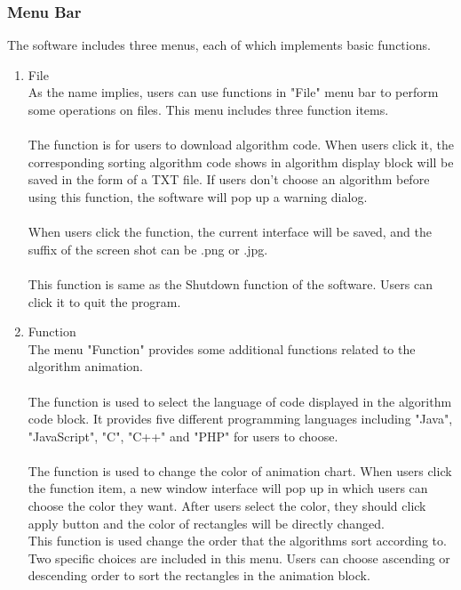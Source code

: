\documentclass[paper=a4, fontsize=11pt,twoside]{scrartcl}		%
\begin{document}
\subsubsection{Menu Bar}
The software includes three menus, each of which implements basic functions.  
\begin{enumerate}
\item File \\
As the name implies, users can use functions in "File" menu bar to perform some operations on files. This menu includes three function items.\\\\
 The function is for users to download algorithm code. When users click it, the corresponding sorting algorithm code shows in algorithm display block will be saved in the form of a TXT file. If users don’t choose an algorithm before using this function, the software will pop up a warning dialog.\\\\
 When users click the function, the current interface will be saved, and the suffix of the screen shot can be .png or .jpg. \\\\
 This function is same as the Shutdown function of the software. Users can click it to quit the program.\\
\item Function \\
The menu "Function" provides some additional functions related to the algorithm animation.\\\\
 The function is used to select the language of code displayed in the algorithm code block. It provides five different programming languages including "Java", "JavaScript", "C", "C++" and "PHP" for users to choose. \\\\
 The function is used to change the color of animation chart. When users click the function item, a new window interface will pop up in which users can choose the color they want. After users select the color, they should click apply button and the color of rectangles will be directly changed.\\
 This function is used change the order that the algorithms sort according to. Two specific choices are included in this menu. Users can choose ascending or descending order to sort the rectangles in the animation block. \\


\end{enumerate}
\end{document}
